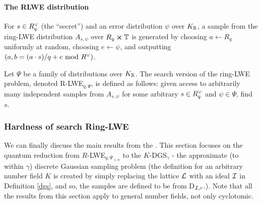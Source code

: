 \paragraph{The RLWE distribution}
\begin{definition}
	For $s \in R^{\vee}_q$ (the ``secret'') and an error distribution $\psi$ over $K_{\mathbb{R}}$, a sample from the ring-LWE distribution $A_{s, \psi}$ over $R_q \cross \mathbb{T}$ is generated by choosing $a \leftarrow R_q$ uniformly at random, choosing $e \leftarrow \psi$, and outputting $(a, b = (a \cdot s)/q + e \text{ mod } R^{\vee})$.
\end{definition}
\begin{definition}
	Let $\Psi$ be a family of distributions over $K_{\mathbb{R}}$. The search version of the ring-LWE problem, denoted R-LWE$_{q, \Psi}$, is defined as follows: given access to arbitrarily many independent samples from $A_{s, \psi}$ for some arbitrary $s \in R^{\vee}_q$ and $\psi \in \Psi$, find $s$.
\end{definition}
\subsubsection{Hardness of search Ring-LWE}\label{h-rlwe}
We can finally discuss the main results from the \cite{ring-lwe}. This section focuses on the quantum reduction from $R$-LWE$_{q, \Psi_{\leq \alpha}}$ to the $K$-DGS$_{\gamma}$ - the approximate (to within $\gamma$) discrete Gaussian sampling problem (the definition for an arbitrary number field $K$ is created by simply replacing the lattice $\mathcal{L}$ with an ideal $\mathcal{I}$ in Definition \ref{dgs}, and so, the samples are defined to be from D$_{\mathcal{I}, r}$.). Note that all the results from this section apply to general number fields, not only cyclotomic.

